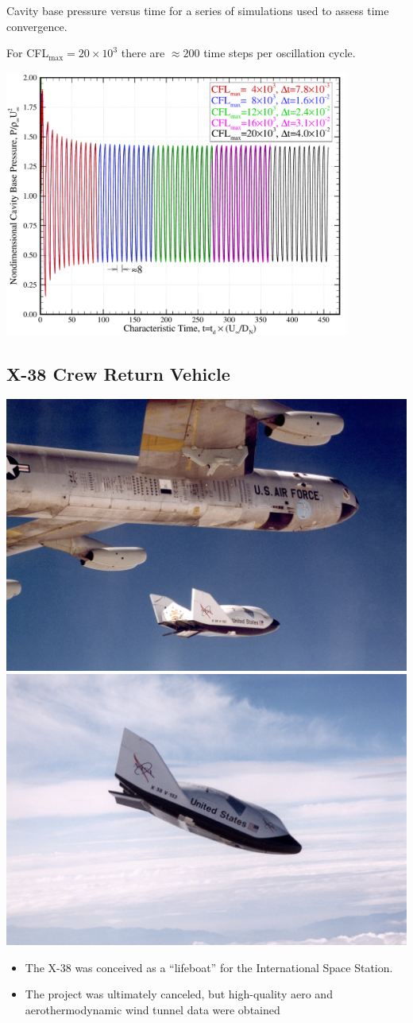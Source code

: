 \documentclass[compress,11pt]{beamer}
\begin{document}
\frame
{
  \vspace{-.5em}
  \scriptsize
  Cavity base pressure versus time for a series of simulations used to assess time convergence.

  For CFL$_{\text{max}}=20\times 10^3$ there are $\approx 200$ time steps per oscillation cycle.
  \vspace{.5em}

  \centerline{\includegraphics[width=0.85\textwidth]{figures/sphere_cavity/LD_2.0/base_pressure_history}}
}

\subsection*{X-38 Crew Return Vehicle}
\frame
{
  \vspace{-2em}
  \begin{center}
    \includegraphics[width=.47\textwidth]{figures/x38/EC99-45080-25} \hspace{1em}
    \includegraphics[width=.47\textwidth]{figures/x38/EC99-45080-21-2}
  \end{center}

  \scriptsize
  \begin{itemize}
    \item The X-38 was conceived as a ``lifeboat'' for the International Space Station.
    \item The project was ultimately canceled, but high-quality aero and aerothermodynamic wind tunnel data were obtained
  \end{itemize}
}
\end{document}

